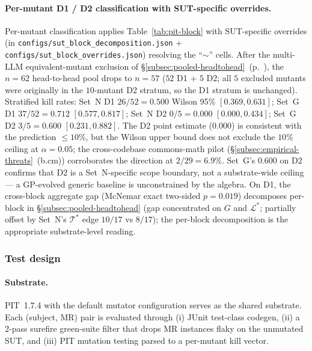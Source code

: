 \documentclass[acmsmall, screen]{acmart}
\begin{document}
\paragraph{Per-mutant D1 / D2 classification with SUT-specific overrides.}
Per-mutant classification applies Table~\ref{tab:pit-block} with SUT-specific overrides (in \texttt{configs/sut\_block\_decomposition.json} + \texttt{configs/sut\_block\_overrides.json}) resolving the ``$\sim$'' cells. After the multi-LLM equivalent-mutant exclusion of \S\ref{subsec:pooled-headtohead}~(p.~\pageref{para:eq-mutant-footnote}), the $n = 62$ head-to-head pool drops to $n = 57$ ($52$ D1 + $5$ D2; all $5$ excluded mutants were originally in the $10$-mutant D2 stratum, so the D1 stratum is unchanged). Stratified kill rates: Set~N D1 $26/52 = 0.500$ Wilson 95\% $[0.369, 0.631]$; Set~G D1 $37/52 = 0.712$ $[0.577, 0.817]$; Set~N D2 $0/5 = 0.000$ $[0.000, 0.434]$; Set~G D2 $3/5 = 0.600$ $[0.231, 0.882]$. The D2 point estimate ($0.000$) is consistent with the prediction $\le 10\%$, but the Wilson upper bound does not exclude the $10\%$ ceiling at $\alpha = 0.05$; the cross-codebase commons-math pilot (\S\ref{subsec:empirical-threats}~(b.cm)) corroborates the direction at $2/29 = 6.9\%$. Set~G's $0.600$ on D2 confirms that D2 is a Set~N-specific scope boundary, not a substrate-wide ceiling --- a GP-evolved generic baseline is unconstrained by the algebra. On D1, the cross-block aggregate gap (McNemar exact two-sided $p = 0.019$) decomposes per-block in \S\ref{subsec:pooled-headtohead} (gap concentrated on $G$ and $\mathcal{L}^{*}$; partially offset by Set~N's $\mathcal{T}^{*}$ edge $10/17$ vs $8/17$); the per-block decomposition is the appropriate substrate-level reading.

\subsubsection{Test design}
\label{subsec:test-design}

\paragraph{Substrate.}
PIT~1.7.4 with the default mutator configuration serves as the
shared substrate. Each (subject, MR) pair is evaluated through (i)
JUnit test-class codegen, (ii) a 2-pass surefire green-suite filter
that drops MR instances flaky on the unmutated SUT, and (iii) PIT
mutation testing parsed to a per-mutant kill vector.
\end{document}
